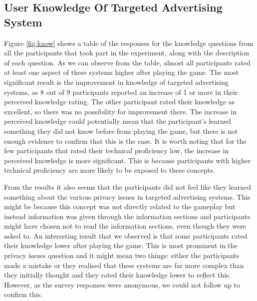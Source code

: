 \documentclass{l4proj}
\begin{document}
\subsection{User Knowledge Of Targeted Advertising System}
Figure \ref{fig:know} shows a table of the responses for the knowledge questions from all the participants that took part in the experiment, along with the description of each question. As we can observe from the table, almost all participants rated at least one aspect of these systems higher after playing the game. The most significant result is the improvement in knowledge of targeted advertising systems, as 8 out of 9 participants reported an increase of 1 or more in their perceived knowledge rating. The other participant rated their knowledge as excellent, so there was no possibility for improvement there.
The increase in perceived knowledge could potentially mean that the participant's learned something they did not know before from playing the game, but there is not enough evidence to confirm that this is the case. It is worth noting that for the few participants that rated their technical proficiency low, the increase in perceived knowledge is more significant. This is because participants with higher technical proficiency are more likely to be exposed to these concepts. 

From the results it also seems that the participants did not feel like they learned something about the various privacy issues in targeted advertising systems. This might be because this concept was not directly related to the gameplay but instead information was given through the information sections and participants might have chosen not to read the information sections, even though they were asked to. An interesting result that we observed is that some participants rated their knowledge lower after playing the game. This is most prominent in the privacy issues question and it might mean two things: either the participants made a mistake or they realised that these systems are far more complex than they initially thought and they rated their knowledge lower to reflect this. However, as the survey responses were anonymous, we could not follow up to confirm this.
\end{document}
